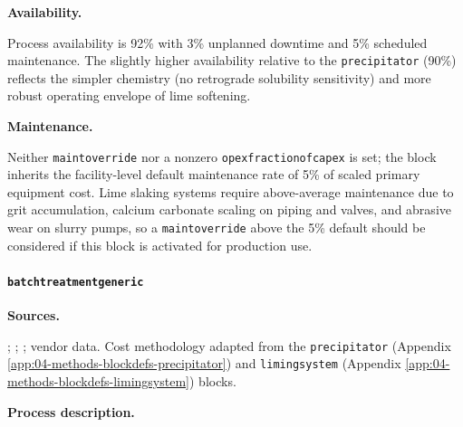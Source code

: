 \documentclass{article}
\renewcommand\_{\textunderscore\allowbreak}
\begin{document}
\medskip
\noindent\textbf{Availability.}\quad

Process availability is 92\% with 3\% unplanned downtime and 5\% scheduled maintenance. The slightly higher availability relative to the \texttt{precipitator} (90\%) reflects the simpler chemistry (no retrograde solubility sensitivity) and more robust operating envelope of lime softening.

\medskip
\noindent\textbf{Maintenance.}\quad

Neither \texttt{maint\_override} nor a nonzero \texttt{opex\_fraction\_of\_capex} is set; the block inherits the facility-level default maintenance rate of 5\% of scaled primary equipment cost. Lime slaking systems require above-average maintenance due to grit accumulation, calcium carbonate scaling on piping and valves, and abrasive wear on slurry pumps, so a \texttt{maint\_override} above the 5\% default should be considered if this block is activated for production use.

\clearpage
\paragraph{\texttt{batch\_treatment\_generic}}\label{app:04-methods-blockdefs-batchtreat}\leavevmode\par

\medskip
\noindent\textbf{Sources.}\quad

\citet{srkconsultingSECTechnicalReport2023a}; \citet{ausimmMonograph27Cost}; \citet{petersPlantDesignEconomics1991}; vendor data. Cost methodology adapted from the \texttt{precipitator} (Appendix \ref{app:04-methods-blockdefs-precipitator}) and \texttt{liming\_system} (Appendix \ref{app:04-methods-blockdefs-limingsystem}) blocks.

\medskip
\noindent\textbf{Process description.}\quad
\end{document}
